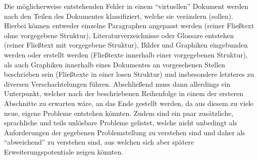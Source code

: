 Die möglicherweise entstehenden Fehler in einem \enquote{virtuellen} Dokument werden nach den Teilen des Dokumentes klassifiziert, welche sie verändern (sollen). Hierbei können entweder einzelne Paragraphen angepasst werden (reiner Fließtext ohne vorgegebene Struktur),%
Literaturverzeichnisse oder Glossare entstehen (reiner Fließtext mit vorgegebene Struktur),%
Bilder und Graphiken eingebunden werden oder erstellt werden (Fließtexte innerhalb einer vorgegebenen Struktur),%
als auch Graphiken innerhalb eines Dokumentes an vorgesehenen Stellen beschrieben sein (Fließtexte in einer losen Struktur) und insbesondere letzteres zu diversen Verschachtelungen führen.%
Abschließend muss dann allerdings ein Unterpunkt, welcher nach der beschriebenen Reihenfolge in einem der ersteren Abschnitte zu erwarten wäre, an das Ende gestellt werden, da aus diesem zu viele neue, eigene Probleme entstehen könnten.%
Zudem sind ein paar zusätzliche, sprachliche und teils unlösbare Probleme gelistet, welche nicht unbedingt als Anforderungen der gegebenen Problemstellung zu verstehen sind und daher als \enquote{abweichend} zu verstehen sind, aus welchen sich aber spätere Erweiterungspotentiale zeigen könnten.

